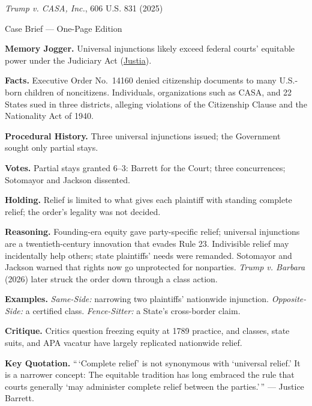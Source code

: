 \documentclass[12pt]{article}
\begin{document}
\begin{center}
{\Large \textit{Trump v. CASA, Inc.}, 606 U.S. 831 (2025)\par}
\vspace{0.3em}
{\normalsize Case Brief --- One-Page Edition\par}
\end{center}

\textbf{Memory Jogger.} Universal injunctions likely exceed federal courts' equitable power under the Judiciary Act (\href{https://supreme.justia.com/cases/federal/us/606/24a884/}{Justia}).

\textbf{Facts.} Executive Order No.~14160 denied citizenship documents to many U.S.-born children of noncitizens. Individuals, organizations such as CASA, and 22 States sued in three districts, alleging violations of the Citizenship Clause and the Nationality Act of 1940.

\textbf{Procedural History.} Three universal injunctions issued; the Government sought only partial stays.

\textbf{Votes.} Partial stays granted 6--3: Barrett for the Court; three concurrences; Sotomayor and Jackson dissented.

\textbf{Holding.} Relief is limited to what gives each plaintiff with standing complete relief; the order's legality was not decided.

\textbf{Reasoning.} Founding-era equity gave party-specific relief; universal injunctions are a twentieth-century innovation that evades Rule 23. Indivisible relief may incidentally help others; state plaintiffs' needs were remanded. Sotomayor and Jackson warned that rights now go unprotected for nonparties. \textit{Trump v. Barbara} (2026) later struck the order down through a class action.

\textbf{Examples.} \emph{Same-Side:} narrowing two plaintiffs' nationwide injunction. \emph{Opposite-Side:} a certified class. \emph{Fence-Sitter:} a State's cross-border claim.

\textbf{Critique.} Critics question freezing equity at 1789 practice, and classes, state suits, and APA vacatur have largely replicated nationwide relief.

\textbf{Key Quotation.} ``\,`Complete relief' is not synonymous with `universal relief.' It is a narrower concept: The equitable tradition has long embraced the rule that courts generally `may administer complete relief between the parties.'\,'' --- Justice Barrett.
\end{document}
